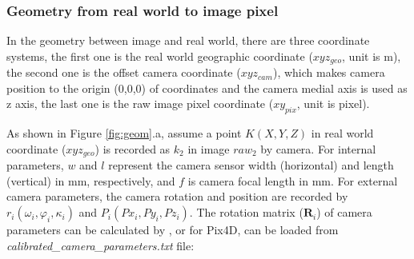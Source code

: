 \documentclass[doublespacing]{configs/bmcart}
\begin{document}
\subsubsection*{Geometry from real world to image pixel}
In the geometry between image and real world, there are three coordinate systems, the first one is the real world geographic coordinate ($xyz_{geo}$, unit is m), the second one is the offset camera coordinate ($xyz_{cam}$), which makes camera position to the origin (0,0,0) of coordinates and the camera medial axis is used as z axis, the last one is the raw image pixel coordinate ($xy_{pix}$, unit is pixel). 

As shown in Figure \ref{fig:geom}.a, assume a point $K(X,Y,Z)$ in real world coordinate ($xyz_{geo}$) is recorded as $k_2$ in image $raw_2$ by camera. For internal parameters, $w$ and $l$ represent the camera sensor width (horizontal) and length (vertical) in mm, respectively, and $f$ is camera focal length in mm. For external camera parameters, the camera rotation and position are recorded by $r_i (\omega_i, \varphi_i, \kappa_i)$ \cite{pix4d_support_yaw_2020} and $P_i (Px_{i}, Py_{i}, Pz_{i})$. The rotation matrix ($\mathbf{R}_i$) of camera parameters 
can be calculated by \cite{pix4d_support_how_2020}, or for Pix4D, can be loaded from \textit{calibrated\_camera\_parameters.txt} file:
\end{document}
